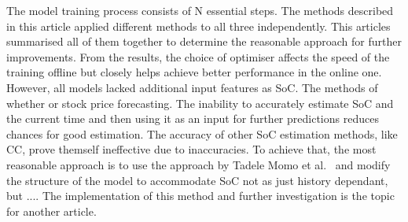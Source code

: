 %
%
The model training process consists of N essential steps.
The methods described in this article applied different methods to all three independently.
This articles summarised all of them together to determine the reasonable approach for further improvements.
From the results, the choice of optimiser affects the speed of the training offline but closely helps achieve better performance in the online one.
However, all models lacked additional input features as SoC.
The methods of whether or stock price forecasting.
The inability to accurately estimate SoC and the current time and then using it as an input for further predictions reduces chances for good estimation.
The accuracy of other SoC estimation methods, like CC, prove themself ineffective due to inaccuracies. 
To achieve that, the most reasonable approach is to use the approach by Tadele Momo et al.~\cite{mamo_long_2020} and modify the structure of the model to accommodate SoC not as just history dependant, but ....
The implementation of this method and further investigation is the topic for another article.